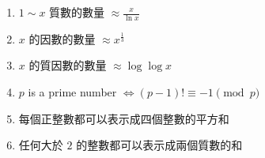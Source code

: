 \begin{enumerate}
    \item $1 \sim x$ 質數的數量 $\approx \frac{x}{\ln x}$
    \item $x$ 的因數的數量 $\approx x^\frac{1}{3}$
    \item $x$ 的質因數的數量 $\approx \log{\log{x}}$
    \item $p$ is a prime number $\Leftrightarrow (p-1)! \equiv -1  \pmod{p}$
    \item 每個正整數都可以表示成四個整數的平方和
    \item 任何大於 $2$ 的整數都可以表示成兩個質數的和
\end{enumerate}
